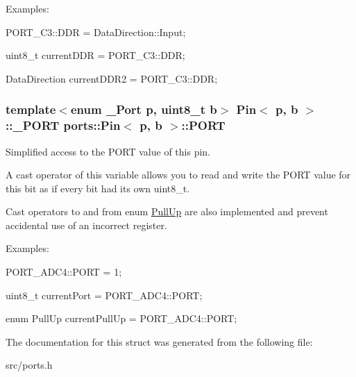 Examples\+:


\begin{DoxyItemize}
\item {\ttfamily P\+O\+R\+T\+\_\+\+C3\+::\+D\+DR = Data\+Direction\+::\+Input;}
\item {\ttfamily uint8\+\_\+t current\+D\+DR = P\+O\+R\+T\+\_\+\+C3\+::\+D\+DR;}
\item {\ttfamily Data\+Direction current\+D\+D\+R2 = P\+O\+R\+T\+\_\+\+C3\+::\+D\+DR;} 
\end{DoxyItemize}
\subsubsection[{\texorpdfstring{P\+O\+RT}{PORT}}]{\setlength{\rightskip}{0pt plus 5cm}template$<$enum \+\_\+\+Port p, uint8\+\_\+t b$>$ {\bf Pin}$<$ p, b $>$\+::{\bf \+\_\+\+P\+O\+RT} {\bf ports\+::\+Pin}$<$ p, b $>$\+::P\+O\+RT\hspace{0.3cm}{\ttfamily [static]}}\hypertarget{structports_1_1Pin_aaa08f0eb17ef31d9f46d65d50c8a093e}{}\label{structports_1_1Pin_aaa08f0eb17ef31d9f46d65d50c8a093e}


Simplified access to the P\+O\+RT value of this pin. 

A cast operator of this variable allows you to read and write the P\+O\+RT value for this bit as if every bit had its own {\ttfamily uint8\+\_\+t}.

Cast operators to and from enum \hyperlink{namespaceports_a49bf0ccedb4cfed89a328574e53bec07}{Pull\+Up} are also implemented and prevent accidental use of an incorrect register.

Examples\+:


\begin{DoxyItemize}
\item {\ttfamily P\+O\+R\+T\+\_\+\+A\+D\+C4\+::\+P\+O\+RT = 1;}
\item {\ttfamily uint8\+\_\+t current\+Port = P\+O\+R\+T\+\_\+\+A\+D\+C4\+::\+P\+O\+RT;}
\item {\ttfamily enum Pull\+Up current\+Pull\+Up = P\+O\+R\+T\+\_\+\+A\+D\+C4\+::\+P\+O\+RT;} 
\end{DoxyItemize}

The documentation for this struct was generated from the following file\+:\begin{DoxyCompactItemize}
\item 
src/ports.\+h\end{DoxyCompactItemize}
